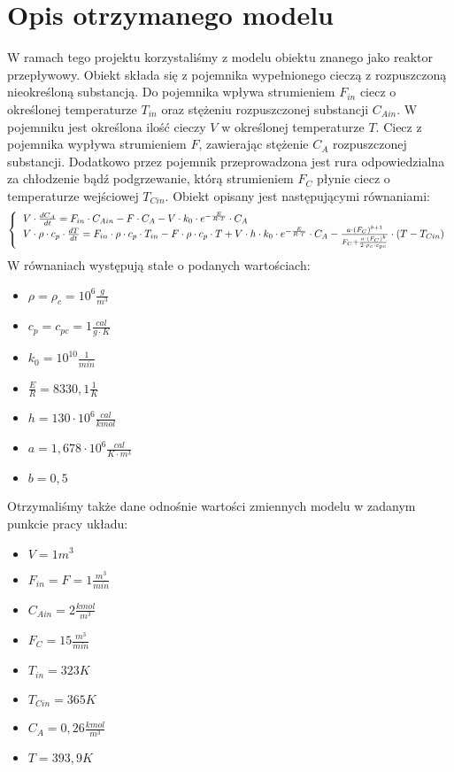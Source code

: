 \chapter{Opis otrzymanego modelu}

W ramach tego projektu korzystaliśmy z modelu obiektu znanego jako reaktor przepływowy. Obiekt składa się z pojemnika wypełnionego cieczą z rozpuszczoną nieokreśloną substancją. Do pojemnika wpływa strumieniem $F_{in}$ ciecz o określonej temperaturze $T_{in}$ oraz stężeniu rozpuszczonej substancji $C_{Ain}$. W pojemniku jest określona ilość cieczy $V$ w określonej temperaturze $T$. Ciecz z pojemnika wypływa strumieniem $F$, zawierając stężenie $C_A$ rozpuszczonej substancji. Dodatkowo przez pojemnik przeprowadzona jest rura odpowiedzialna za chłodzenie bądź podgrzewanie, którą strumieniem $F_C$ płynie ciecz o temperaturze wejściowej $T_{Cin}$. Obiekt opisany jest następującymi równaniami:
\begin{equation}
	\left\{
	\begin{tabular}{l}
	$V \cdot \frac{dC_A}{dt}=F_{in} \cdot C_{Ain}-F \cdot C_A-V \cdot k_0 \cdot e^{-\frac{E}{R \cdot T}} \cdot C_A$\\
	$V \cdot \rho \cdot c_p \cdot \frac{dT}{dt}=F_{in} \cdot \rho \cdot c_p \cdot T_{in}-F \cdot \rho \cdot c_p \cdot T+V \cdot h \cdot k_0 \cdot e^{-\frac{E}{R \cdot T}} \cdot C_A - \frac{a \cdot (F_C)^{b+1}}{F_C+\frac{a \cdot (F_C)^b}{2 \cdot \rho_c \cdot c_{pc}}} \cdot (T-T_{Cin})$
	\end{tabular}
	\right.
\end{equation}
W równaniach występują stałe o podanych wartościach:\\
\begin{itemize}
	\item $\rho=\rho_c=10^6\frac{g}{m^3}$
	\item $c_p=c_{pc} = 1 \frac{cal}{g\cdot K}$
	\item $k_0 = 10^{10} \frac{1}{min}$
	\item $\frac{E}{R} = 8330,1 \frac{1}{K}$
	\item $h = 130\cdot 10^6 \frac{cal}{kmol}$
	\item $a = 1,678\cdot 10^6\frac{cal}{K\cdot m^3}$
	\item $b = 0,5$
\end{itemize}
Otrzymaliśmy także dane odnośnie wartości zmiennych modelu w zadanym punkcie pracy układu:\\
\begin{itemize}
	\item $V=1m^3$
	\item $F_{in} = F = 1 \frac{m^3}{min}$
	\item $C_{Ain} = 2 \frac{kmol}{m^3}$
	\item $F_C = 15 \frac{m^3}{min}$
	\item $T_{in} = 323K$
	\item $T_{Cin} = 365K$
	\item $C_A = 0,26\frac{kmol}{m^3}$
	\item $T = 393,9K$
\end{itemize}
